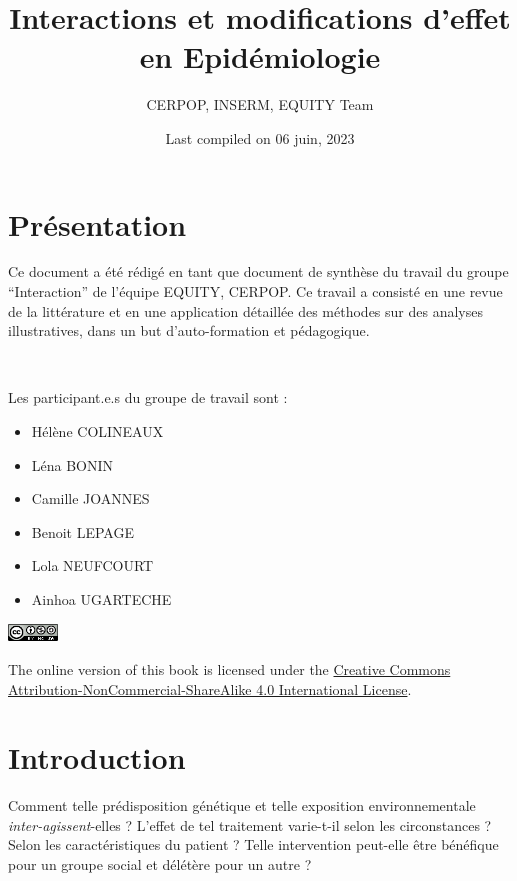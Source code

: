 \documentclass[
]{book}
\title{Interactions et modifications d'effet en Epidémiologie}
\author{CERPOP, INSERM, EQUITY Team}
\date{Last compiled on 06 juin, 2023}
\providecommand{\tightlist}{%
  \setlength{\itemsep}{0pt}\setlength{\parskip}{0pt}}
\begin{document}
\maketitle

{
\setcounter{tocdepth}{1}
\tableofcontents
}
\hypertarget{pruxe9sentation}{%
\chapter{Présentation}\label{pruxe9sentation}}

Ce document a été rédigé en tant que document de synthèse du travail du groupe ``Interaction'' de l'équipe EQUITY, CERPOP.
Ce travail a consisté en une revue de la littérature et en une application détaillée des méthodes sur des analyses illustratives, dans un but d'auto-formation et pédagogique.

\includegraphics[width=0\textwidth,height=\textheight]{img/Image0.png}

Les participant.e.s du groupe de travail sont :

\begin{itemize}
\tightlist
\item
  Hélène COLINEAUX\\
\item
  Léna BONIN
\item
  Camille JOANNES
\item
  Benoit LEPAGE
\item
  Lola NEUFCOURT
\item
  Ainhoa UGARTECHE
\end{itemize}

\includegraphics[width=0.1\textwidth,height=\textheight]{img/by-nc-sa.png}

The online version of this book is licensed under the \href{https://creativecommons.org/licenses/by-nc-sa/4.0/}{Creative Commons Attribution-NonCommercial-ShareAlike 4.0 International License}.

\hypertarget{introduction}{%
\chapter{Introduction}\label{introduction}}

Comment telle prédisposition génétique et telle exposition environnementale \emph{inter-agissent}-elles ? L'effet de tel traitement varie-t-il selon les circonstances ? Selon les caractéristiques du patient ? Telle intervention peut-elle être bénéfique pour un groupe social et délétère pour un autre ?
\end{document}
